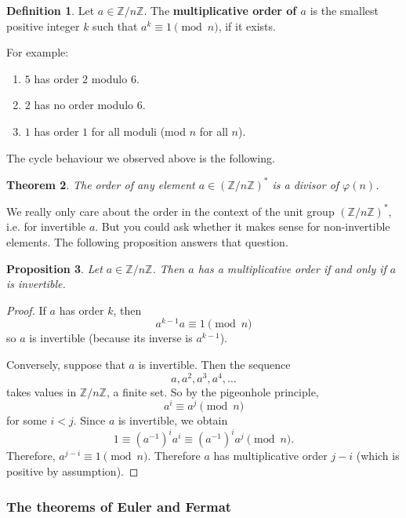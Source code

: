 \documentclass{article}
\theoremstyle{plain}
\newtheorem{theorem}{Theorem}
\newtheorem{proposition}[theorem]{Proposition}
\theoremstyle{definition}
\newtheorem{definition}[theorem]{Definition}
\theoremstyle{remark}
\numberwithin{theorem}{section}
\newcommand{\ZZ}{\mathbb{Z}}
\begin{document}
\begin{definition}
  Let $a \in \ZZ/n\ZZ$.  The \textbf{multiplicative order of $a$} is the smallest positive integer $k$ such that $a^k \equiv 1 \pmod n$, if it exists.
\end{definition}

For example:
\begin{enumerate}
\item $5$ has order $2$ modulo $6$.
\item $2$ has no order modulo $6$.
\item $1$ has order $1$ for all moduli (mod $n$ for all $n$).
\end{enumerate}


The cycle behaviour we observed above is the following.

\begin{theorem}
The order of any element $a \in (\ZZ/n\ZZ)^*$ is a divisor of $\varphi(n)$.
\end{theorem}

We really only care about the order in the context of the unit group $(\ZZ/n\ZZ)^*$, i.e. for invertible $a$.  But you could ask whether it makes sense for non-invertible elements.  The following proposition answers that question.

\begin{proposition}
Let $a \in \ZZ/n\ZZ$.  Then $a$ has a multiplicative order if and only if $a$ is invertible.
\end{proposition}

\begin{proof}
If $a$ has order $k$, then
\[
a^{k-1} a \equiv 1 \pmod n
\]
so $a$ is invertible (because its inverse is $a^{k-1}$).

Conversely, suppose that $a$ is invertible.  Then the sequence
\[
a, a^2, a^3, a^4, \ldots
\]
takes values in $\ZZ/n\ZZ$, a finite set.  So by the pigeonhole principle, 
\[
a^i \equiv a^j \pmod n
\]
for some $i < j$.  Since $a$ is invertible, we obtain
\[
1 \equiv (a^{-1})^i a^i \equiv (a^{-1})^i a^j \pmod n.
\]
Therefore, $a^{j-i} \equiv 1 \pmod n$.  Therefore $a$ has multiplicative order $j-i$ (which is positive by assumption).
\end{proof}



\subsubsection{The theorems of Euler and Fermat}
\end{document}
